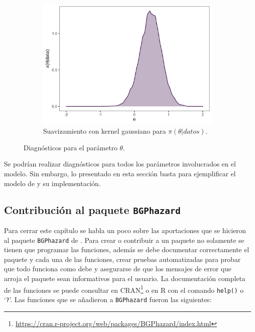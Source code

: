 \documentclass[11pt,a4paper]{article}
\begin{document}
\begin{figure}[!htb]
    \vspace{0.2cm}
    \begin{subfigure}[t]{\textwidth}
    \centering\includegraphics[width=\linewidth]{theta_densities.png}
    \caption{Suavizamiento con kernel gaussiano para $\pi (\theta | datos)$.}
    \label{fig:theta_densities}
    \end{subfigure}
     \caption{Diagnósticos para el parámetro $\theta$. }
    \label{fig:theta}
\end{figure}

Se podrían realizar diagnósticos para todos los parámetros involucrados en el modelo. Sin embargo, lo presentado en esta sección basta para ejemplificar el modelo de \citet{nieto} y su implementación.

\clearpage
\newpage

\subsection{Contribución al paquete \texttt{BGPhazard}}

Para cerrar este capítulo se habla un poco sobre las aportaciones que se hicieron al paquete \texttt{BGPhazard} de \citet{bgphazard}. Para crear o contribuir a un paquete no solamente se tienen que programar las funciones, además se debe documentar correctamente el paquete y cada una de las funciones, crear pruebas automatizadas para probar que todo funciona como debe y asegurarse de que los mensajes de error que arroja el paquete sean informativos para el usuario. La documentación completa de las funciones se puede consultar en CRAN\footnote{\url{https://cran.r-project.org/web/packages/BGPhazard/index.html}} o en R con el comando \texttt{help()} o `\texttt{?}'. Las funciones que se añadieron a \texttt{BGPhazard} fueron las siguientes:
\end{document}

